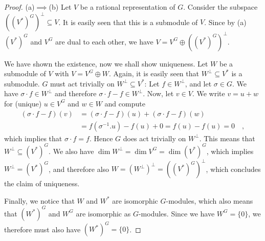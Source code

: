 \begin{proof}
  (a)$\implies$(b) \; Let $V$ be a rational representation of $G$.
  Consider the subspace $ ((V^\ast)^G)^\bot \subseteq V $.
  It is easily seen that this is a submodule of $V$.
  Since by (a) $(V^\ast)^G$ and $V^G$ are dual to each other, we have $V = V^G \oplus ((V^\ast)^G)^\bot $.
  
  We have shown the existence, now we shall show uniqueness.
  Let $W$ be a submodule of $V$ with $V = V^G \oplus W $.
  Again, it is easily seen that $W^\bot \subseteq V^\ast$ is a submodule.
  $G$ must act trivially on $W^\bot \subseteq V^\ast$:
  Let $f \in W^\bot$, and let $\sigma \in G$.
  We have $\sigma\cdot f \in W^\bot$ and therefore $\sigma\cdot f - f \in W^\bot$.
  Now, let $v \in V$.
  We write $v = u + w$ for (unique) $u \in V^G$ and $w \in W$ and compute
  \begin{equation*}
    \begin{aligned}
      (\sigma\cdot f -f)(v)&=(\sigma\cdot f -f)(u) + (\sigma\cdot f -f)(w)\\
      &=f(\sigma^{-1}.u) - f(u) + 0
      =f(u)-f(u) = 0 \quad ,
    \end{aligned}
  \end{equation*}
  which implies that $\sigma\cdot f = f$.
  Hence $G$ does act trivially on $W^\bot$.
  This means that $W^\bot \subseteq (V^\ast)^G$.
  We also have $\operatorname{dim}W^\bot = \operatorname{dim}V^G = \operatorname{dim}(V^\ast)^G$, which implies $W^\bot = (V^\ast)^G$, and therefore also $W = (W^\bot)^\bot = ((V^\ast)^G)^\bot$, which concludes the claim of uniqueness.
  
  Finally, we notice that $W$ and $W^\ast$ are isomorphic $G$-modules, which also means that $(W^\ast)^G$ and $W^G$ are isomorphic as $G$-modules.
  Since we have \linebreak$W^G = \{0\}$, we therefore must also have $(W^\ast)^G = \{0\}$.
  

\end{proof}
